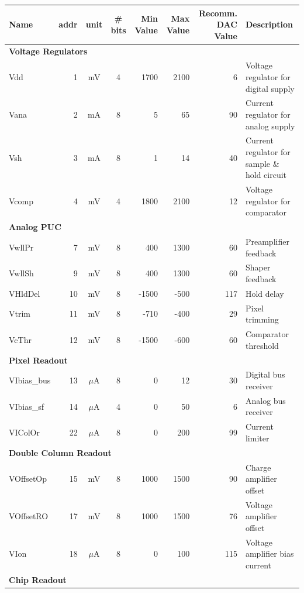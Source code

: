 {\begin{table}[h]
\begin{center}
	\bigskip

	{\scriptsize
	\begin{tabular}{lrccrrrl}
	\toprule
	Name & addr & unit & \# bits & \multicolumn{1}{p{0.8cm}}{Min Value} & \multicolumn{1}{p{0.8cm}}{Max Value} & \multicolumn{1}{p{1.2cm}}{Recomm. DAC Value} & Description \\ 
	\midrule
	\multicolumn{ 8}{l}{\textbf{Voltage Regulators}} \\ 
	Vdd         &  1 &   mV    & 4 & 1700 & 2100 & 6 & Voltage regulator for digital supply \\ 
	Vana        &  2 &   mA    & 8 & 5 & 65 & 90 & Current regulator for analog supply \\ 
	Vsh         &  3 &   mA    & 8 & 1 & 14 & 40 & Current regulator for sample \& hold circuit \\ 
	Vcomp       &  4 &   mV    & 4 & 1800 & 2100 & 12 & Voltage regulator for comparator \\ 
	\midrule
	\multicolumn{ 8}{l}{\textbf{Analog PUC}} \\ 
	VwllPr      &  7 &   mV    & 8 & 400 & 1300 & 60 & Preamplifier feedback  \\ 
	VwllSh      &  9 &   mV    & 8 & 400 & 1300 & 60 & Shaper feedback \\ 
	VHldDel     & 10 &   mV    & 8 & -1500 & -500 & 117 & Hold delay \\ 
	Vtrim       & 11 &   mV    & 8 & -710 & -400 & 29 & Pixel trimming \\ 
	VcThr       & 12 &   mV    & 8 & -1500 & -600 & 60 & Comparator threshold \\ 
	\midrule
	\multicolumn{ 8}{l}{\textbf{Pixel Readout}} \\ 
	VIbias\_bus & 13 & $\mu$A  & 8 & 0 & 12 & 30 & Digital bus receiver \\ 
	VIbias\_sf  & 14 & $\mu$A  & 4 & 0 & 50 & 6 & Analog bus receiver \\ 
	VIColOr     & 22 & $\mu$A  & 8 & 0 & 200 & 99 & Current limiter \\ 
	\midrule
	\multicolumn{ 8}{l}{\textbf{Double Column Readout}} \\ 
	VOffsetOp   & 15 &   mV    & 8 & 1000 & 1500 & 90 & Charge amplifier offset \\ 
	VOffsetRO   & 17 &   mV    & 8 & 1000 & 1500 & 76 & Voltage amplifier offset \\ 
	VIon        & 18 & $\mu$A  & 8 & 0 & 100 & 115 & Voltage amplifier bias current \\ 
	\midrule
	\multicolumn{ 8}{l}{\textbf{Chip Readout}} \\ 

\end{tabular}}
\end{center}
\end{table}}
